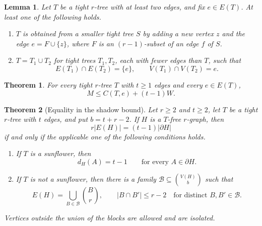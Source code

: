 \documentclass[10pt,a4paper]{amsart}
\newtheorem{lemma}{Lemma}
\newtheorem{theorem}{Theorem}
\newcommand{\sh}{\partial}
\begin{document}
	\begin{lemma}\label{lem:structure}
		Let $T$ be a tight $r$-tree with at least two edges, and fix
		$e\in E(T)$. At least one of the following holds.
		\begin{enumerate}[label=\textup{(\roman*)},leftmargin=*]
			\item\label{case:leaf}
			$T$ is obtained from a smaller tight tree $S$ by adding a new
			vertex $z$ and the edge $e=F\cup\{z\}$, where $F$ is an
			$(r-1)$-subset of an edge $f$ of $S$.
			\item\label{case:gluing}
			$T=T_1\cup T_2$ for tight trees $T_1,T_2$, each with fewer edges
			than $T$, such that
			\[
			E(T_1)\cap E(T_2)=\{e\},\qquad V(T_1)\cap V(T_2)=e.
			\]
		\end{enumerate}
	\end{lemma}

	\begin{theorem}\label{thm:rooted-count}
		For every tight $r$-tree $T$ with $t\ge1$ edges and every
		$e\in E(T)$,
		\begin{equation}\label{eq:rooted-count}
			M\le C(T,e)+(t-1)W.
		\end{equation}
	\end{theorem}

	\begin{theorem}[Equality in the shadow bound]\label{thm:equality-shadow}
		Let $r\ge2$ and $t\ge2$, let $T$ be a tight $r$-tree with $t$
		edges, and put $b=t+r-2$. If $H$ is a $T$-free $r$-graph, then
		\begin{equation}\label{eq:equality-shadow}
			r|E(H)|=(t-1)|\sh H|
		\end{equation}
		if and only if the applicable one of the following conditions holds.
		\begin{enumerate}[label=\textup{(\roman*)},leftmargin=*]
			\item If $T$ is a sunflower, then
			\[
			d_H(A)=t-1\qquad\text{for every }A\in\sh H.
			\]
			\item If $T$ is not a sunflower, then there is a family
			$\mathcal B\subseteq\binom{V(H)}b$ such that
			\begin{equation}\label{eq:equality-blocks}
				E(H)=\bigcup_{B\in\mathcal B}\binom Br,
				\qquad |B\cap B'|\le r-2
				\quad\text{for distinct }B,B'\in\mathcal B.
			\end{equation}
		\end{enumerate}
		Vertices outside the union of the blocks are allowed and are isolated.
	\end{theorem}
\end{document}
